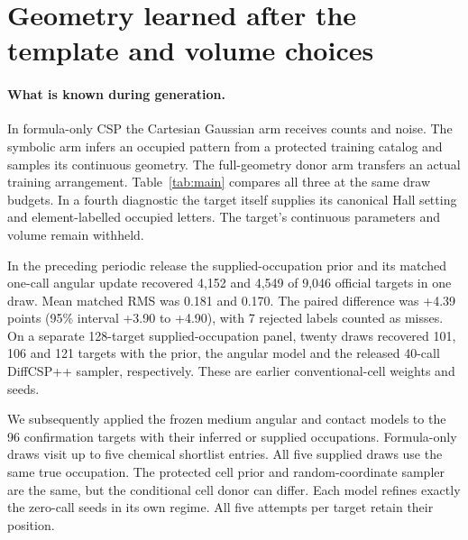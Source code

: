 \section{Geometry learned after the template and volume choices}\label{app:conditioned-results}

\paragraph{What is known during generation.}

In formula-only CSP the Cartesian Gaussian arm receives counts and noise. The symbolic arm infers an occupied pattern from a protected training catalog and samples its continuous geometry. The full-geometry donor arm transfers an actual training arrangement. Table~\ref{tab:main} compares all three at the same draw budgets. In a fourth diagnostic the target itself supplies its canonical Hall setting and element-labelled occupied letters. The target's continuous parameters and volume remain withheld.

In the preceding periodic release the supplied-occupation prior and its matched one-call angular update recovered 4,152 and 4,549 of 9,046 official targets in one draw. Mean matched RMS was 0.181 and 0.170. The paired difference was +4.39 points (95\% interval +3.90 to +4.90), with 7 rejected labels counted as misses. On a separate 128-target supplied-occupation panel, twenty draws recovered 101, 106 and 121 targets with the prior, the angular model and the released 40-call DiffCSP++ sampler, respectively. These are earlier conventional-cell weights and seeds.

We subsequently applied the frozen medium angular and contact models to the 96 confirmation targets with their inferred or supplied occupations. Formula-only draws visit up to five chemical shortlist entries. All five supplied draws use the same true occupation. The protected cell prior and random-coordinate sampler are the same, but the conditional cell donor can differ. Each model refines exactly the zero-call seeds in its own regime. All five attempts per target retain their position.

